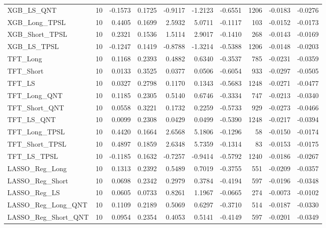 \begin{tabular}{llrrrrrrrr}
\cline{1-10}
XGB\_LS\_QNT & 10 & -0.1573 & 0.1725 & -0.9117 & -1.2123 & -0.6551 & 1206 & -0.0183 & -0.0276 \\
\cline{1-10}
XGB\_Long\_TPSL & 10 & 0.4405 & 0.1699 & 2.5932 & 5.0711 & -0.1117 & 103 & -0.0152 & -0.0173 \\
\cline{1-10}
XGB\_Short\_TPSL & 10 & 0.2321 & 0.1536 & 1.5114 & 2.9017 & -0.1410 & 268 & -0.0143 & -0.0169 \\
\cline{1-10}
XGB\_LS\_TPSL & 10 & -0.1247 & 0.1419 & -0.8788 & -1.3214 & -0.5388 & 1206 & -0.0148 & -0.0203 \\
\cline{1-10}
TFT\_Long & 10 & 0.1168 & 0.2393 & 0.4882 & 0.6340 & -0.3537 & 785 & -0.0231 & -0.0359 \\
\cline{1-10}
TFT\_Short & 10 & 0.0133 & 0.3525 & 0.0377 & 0.0506 & -0.6054 & 933 & -0.0297 & -0.0505 \\
\cline{1-10}
TFT\_LS & 10 & 0.0327 & 0.2798 & 0.1170 & 0.1343 & -0.5683 & 1248 & -0.0271 & -0.0477 \\
\cline{1-10}
TFT\_Long\_QNT & 10 & 0.1185 & 0.2305 & 0.5140 & 0.6746 & -0.3334 & 747 & -0.0213 & -0.0340 \\
\cline{1-10}
TFT\_Short\_QNT & 10 & 0.0558 & 0.3221 & 0.1732 & 0.2259 & -0.5733 & 929 & -0.0273 & -0.0466 \\
\cline{1-10}
TFT\_LS\_QNT & 10 & 0.0099 & 0.2308 & 0.0429 & 0.0499 & -0.5390 & 1248 & -0.0217 & -0.0394 \\
\cline{1-10}
TFT\_Long\_TPSL & 10 & 0.4420 & 0.1664 & 2.6568 & 5.1806 & -0.1296 & 58 & -0.0150 & -0.0174 \\
\cline{1-10}
TFT\_Short\_TPSL & 10 & 0.4897 & 0.1859 & 2.6348 & 5.7359 & -0.1314 & 83 & -0.0153 & -0.0175 \\
\cline{1-10}
TFT\_LS\_TPSL & 10 & -0.1185 & 0.1632 & -0.7257 & -0.9414 & -0.5792 & 1240 & -0.0186 & -0.0267 \\
\cline{1-10}
LASSO\_Reg\_Long & 10 & 0.1313 & 0.2392 & 0.5489 & 0.7019 & -0.3755 & 551 & -0.0209 & -0.0357 \\
\cline{1-10}
LASSO\_Reg\_Short & 10 & 0.0698 & 0.2342 & 0.2979 & 0.3784 & -0.4194 & 597 & -0.0196 & -0.0348 \\
\cline{1-10}
LASSO\_Reg\_LS & 10 & 0.0605 & 0.0733 & 0.8261 & 1.1967 & -0.0665 & 274 & -0.0073 & -0.0102 \\
\cline{1-10}
LASSO\_Reg\_Long\_QNT & 10 & 0.1109 & 0.2189 & 0.5069 & 0.6297 & -0.3710 & 514 & -0.0187 & -0.0330 \\
\cline{1-10}
LASSO\_Reg\_Short\_QNT & 10 & 0.0954 & 0.2354 & 0.4053 & 0.5141 & -0.4149 & 597 & -0.0201 & -0.0349 \\

\end{tabular}
